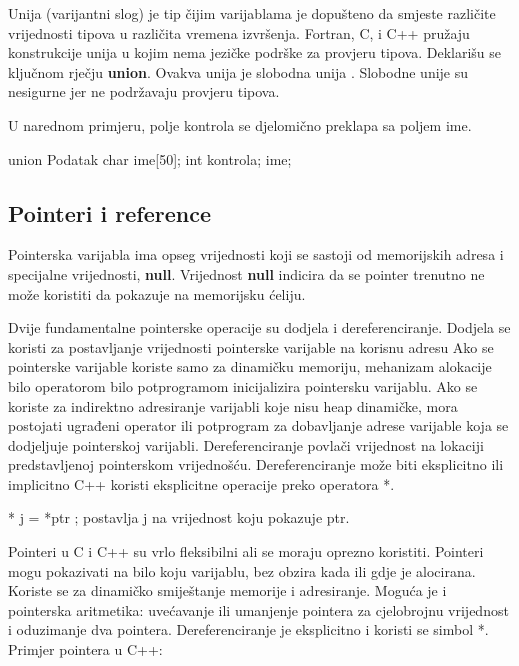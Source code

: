 \documentclass[11pt]{book}
\begin{document}
Unija (varijantni slog) je tip čijim varijablama je dopušteno da smjeste različite vrijednosti tipova u različita vremena izvršenja. Fortran, C, i C++ pružaju konstrukcije unija u kojim nema jezičke podrške za provjeru tipova. Deklarišu se ključnom rječju \textbf{union}. Ovakva unija je slobodna unija . Slobodne unije su nesigurne jer ne podržavaju provjeru tipova.

U narednom primjeru, polje kontrola se djelomično preklapa sa poljem ime.
\begin{shortlisting}
  union Podatak {
      char ime[50];
      int kontrola;
    } ime;
\end{shortlisting}

\subsection{Pointeri i reference}  %

Pointerska varijabla ima opseg vrijednosti koji se sastoji od memorijskih adresa i specijalne vrijednosti, \textbf{null}. Vrijednost \textbf{null} indicira da se pointer trenutno ne može koristiti da pokazuje na memorijsku ćeliju.

Dvije fundamentalne pointerske operacije su dodjela i dereferenciranje. Dodjela se koristi za postavljanje  vrijednosti  pointerske  varijable  na  korisnu  adresu  Ako  se pointerske  varijable koriste samo za dinamičku memoriju, mehanizam alokacije bilo operatorom bilo potprogramom inicijalizira pointersku varijablu. Ako se koriste za indirektno adresiranje varijabli koje nisu heap dinamičke, mora postojati ugrađeni operator ili potprogram za dobavljanje adrese varijable koja se dodjeljuje pointerskoj varijabli. Dereferenciranje povlači vrijednost na lokaciji predstavljenoj pointerskom  vrijednošću.  Dereferenciranje  može  biti  eksplicitno  ili  implicitno  C++  koristi eksplicitne operacije preko operatora *.

\begin{shortlisting}
  * j = *ptr ; postavlja j na vrijednost koju pokazuje ptr.
\end{shortlisting}

Pointeri u C i C++ su vrlo fleksibilni ali se moraju oprezno koristiti. Pointeri mogu pokazivati na bilo koju varijablu, bez obzira kada ili gdje je alocirana. Koriste se za dinamičko smiještanje memorije i adresiranje. Moguća je i pointerska aritmetika: uvećavanje ili umanjenje pointera za cjelobrojnu vrijednost i oduzimanje dva pointera. Dereferenciranje je eksplicitno i koristi se simbol *. Primjer pointera u C++:
\end{document}

